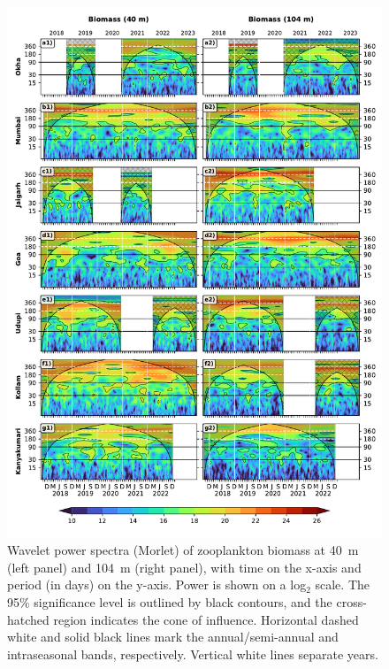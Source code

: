 \documentclass[authoryear,review,11pt]{elsarticle}
\begin{document}
\begin{figure}[htbp]
	\centering
	\includegraphics[width=\textwidth]{./figures/wavelet_40m_104m.pdf} 
	\captionsetup{justification=justified,font=footnotesize,skip=0.05\baselineskip,width=\textwidth}
	\caption{Wavelet power spectra (Morlet) of zooplankton biomass at 40~m (left panel) and 104~m (right panel), with time on the x-axis and period (in days) on the y-axis. Power is shown on a log$_2$ scale. The 95\% significance level is outlined by black contours, and the cross-hatched region indicates the cone of influence. Horizontal dashed white and solid black lines mark the annual/semi-annual and intraseasonal bands, respectively. Vertical white lines separate years.}
	\label{fig:wavelet_40m_104m}
\end{figure}
\end{document}

